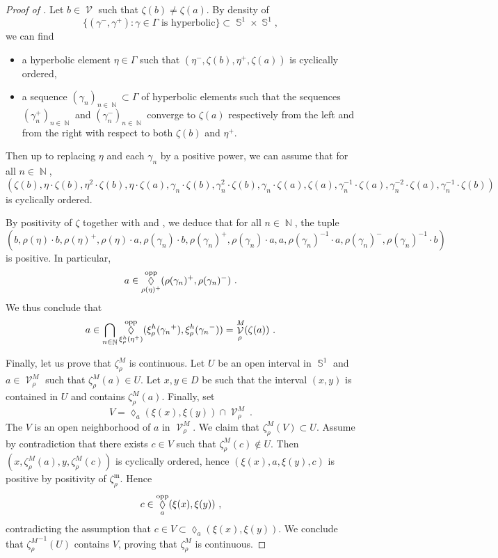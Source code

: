 \documentclass{amsart}
\theoremstyle{plain}
\theoremstyle{definition}
\DeclareMathOperator{\Diam}{\lozenge}
\newcommand{\bdext}{{\Vc^M_\rho}}
\DeclareMathOperator{\Vc}{\mathcal{V}}
\DeclareMathOperator{\Nb}{{\mathbb{N}}}
\DeclareMathOperator{\Sb}{\mathbb{S}}
\newcommand{\opp}{\textnormal{opp}}
\newcommand{\1}{\mathbf{1}}
\begin{document}
\begin{proof}[Proof of ]
Let $b\in\Vc$ such that $\zeta(b)\neq\zeta(a)$. By density of 
\[\{(\gamma^-,\gamma^+):\gamma\in\Gamma\text{ is hyperbolic}\}\subset \Sb^1\times \Sb^1,\]
we can find 
\begin{itemize}
    \item a hyperbolic element $\eta\in\Gamma$ such that $(\eta^-, \zeta(b), \eta^+, \zeta(a))$ is cyclically ordered,
    \item a sequence $(\gamma_n)_{n\in \Nb} \subset \Gamma$ of hyperbolic elements such that the sequences $(\gamma_n^+)_{n\in\Nb}$ and $(\gamma_n^-)_{n\in\Nb}$ converge to $\zeta(a)$ respectively from the left and from the right with respect to both $\zeta(b)$ and $\eta^+$.
\end{itemize}
Then up to replacing $\eta$ and each $\gamma_n$ by a positive power, we can assume that for all $n\in\Nb$,
    \[(\zeta(b),\eta\cdot \zeta(b), \eta^2 \cdot \zeta(b), \eta\cdot \zeta(a), \gamma_n\cdot \zeta(b), \gamma_n^2 \cdot \zeta(b), \gamma_n\cdot \zeta(a), \zeta(a), \gamma_n^{-1} \cdot \zeta(a), \gamma_n^{-2} \cdot \zeta(a), \gamma_n^{-1}\cdot \zeta(b))\]
    is cyclically ordered.

    By positivity of $\zeta$ together with  and , we deduce that for all $n\in\Nb$, the tuple 
    \[(b, \rho(\eta) \cdot b, \rho(\eta)^+, \rho(\eta)\cdot a, \rho(\gamma_n)\cdot b, \rho(\gamma_n)^+, \rho(\gamma_n)\cdot a, a, \rho(\gamma_n)^{-1} \cdot a, \rho(\gamma_n)^-, \rho(\gamma_n)^{-1}\cdot b)\]
    is positive. In particular,
    \[a\in \Diam_{\rho(\eta)^+}^\opp(\rho(\gamma_n)^+, \rho(\gamma_n)^-)~.\]
    We thus conclude that
    \[a\in \bigcap_{n\in \Nb} \Diam_{\xi^h_\rho(\eta^+)}^\opp(\xi^h_\rho({\gamma_n}^+), \xi^h_\rho({\gamma_n}^-)) = \bdext (\zeta(a))~.\qedhere\]


Finally, let us prove that $\zeta_\rho^{M}$ is continuous. Let $U$ be an open interval in $\Sb^1$ and $a\in \bdext$ such that $\zeta_\rho^{M}(a) \in U$.
Let $x,y\in D$ be such that the interval $(x,y)$ is contained in $U$ and contains $\zeta_\rho^{M}(a)$. Finally, set
\[V= \Diam_a(\xi(x),\xi(y))\cap \bdext~.\]
The $V$ is an open neighborhood of $a$ in $\bdext$. We claim that $\zeta_\rho^{M}(V) \subset U$. Assume by contradiction that there exists $c\in V$ such that $\zeta_\rho^{M}(c)\notin U$. Then $(x,\zeta_\rho^{M}(a),y,\zeta_\rho^{M}(c))$ is cyclically ordered, hence $(\xi(x),a,\xi(y),c)$ is positive by positivity of $\zeta_\rho^{\mathrm{m}}$. Hence 
\[c\in \Diam_a^\opp(\xi(x),\xi(y))~,\]
contradicting the assumption that $c\in V\subset \Diam_a(\xi(x),\xi(y))$. We conclude that ${\zeta_\rho^M}^{-1}(U)$ contains $V$, proving that $\zeta_\rho^{M}$ is continuous.
\end{proof}
\end{document}

